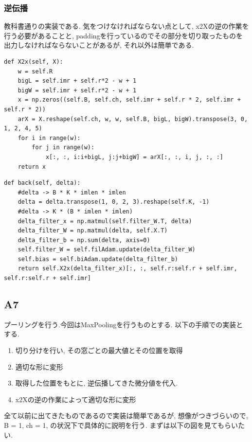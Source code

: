 \documentclass[a4paper,11pt]{jsarticle}
\begin{document}
\subsubsection*{逆伝播}
教科書通りの実装である.
気をつけなければならない点として, x2Xの逆の作業を行う必要があることと,
paddingを行っているのでその部分を切り取ったものを出力しなければならないことがあるが, 
それ以外は簡単である.
\begin{lstlisting}[caption=X2x]
  def X2x(self, X):
    w = self.R
    bigL = self.imr + self.r*2 - w + 1
    bigW = self.imr + self.r*2 - w + 1
    x = np.zeros((self.B, self.ch, self.imr + self.r * 2, self.imr + self.r * 2))
    arX = X.reshape(self.ch, w, w, self.B, bigL, bigW).transpose(3, 0, 1, 2, 4, 5)
    for i in range(w):
        for j in range(w):
            x[:, :, i:i+bigL, j:j+bigW] = arX[:, :, i, j, :, :]
    return x
\end{lstlisting}
\begin{lstlisting}[caption=convlution-back]
  def back(self, delta):
    #delta -> B * K * imlen * imlen
    delta = delta.transpose(1, 0, 2, 3).reshape(self.K, -1)
    #delta -> K * (B * imlen * imlen)
    delta_filter_x = np.matmul(self.filter_W.T, delta)
    delta_filter_W = np.matmul(delta, self.X.T)
    delta_filter_b = np.sum(delta, axis=0)
    self.filter_W = self.filAdam.update(delta_filter_W)
    self.bias = self.biAdam.update(delta_filter_b)
    return self.X2x(delta_filter_x)[:, :, self.r:self.r + self.imr, self.r:self.r + self.imr]
\end{lstlisting}


\subsection{A7}
プーリングを行う.今回はMaxPoolingを行うものとする.
以下の手順での実装とする.
\begin{enumerate}
  \item 切り分けを行い, その窓ごとの最大値とその位置を取得
  \item 適切な形に変形
  \item 取得した位置をもとに, 逆伝播してきた微分値を代入.
  \item x2Xの逆の作業によって適切な形に変形
\end{enumerate}

全て以前に出てきたものであるので実装は簡単であるが, 
想像がつきづらいので, B = 1, ch = 1, の状況下で具体的に説明を行う.
まずは以下の図を見てもらいたい.
\end{document}
